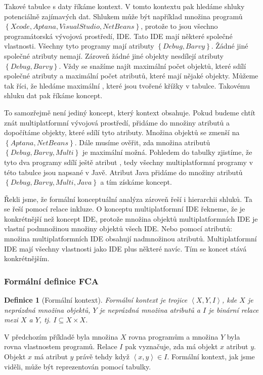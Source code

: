 \documentclass[12pt]{article}
\newcommand{\sssection}[1]{\subsubsection{#1}}
\newcommand{\adds}[1]{\left\{#1\right\}}
\newcommand{\addsp}[1]{\left<#1\right>}
\newtheorem{mydef}{Definice}
\begin{document}
Takové tabulce s daty říkáme kontext. V tomto kontextu pak hledáme shluky potenciálně zajímavých dat. Shlukem může být například množina programů $\adds{Xcode, Aptana, VisualStudio, NetBeans}$, protože to jsou všechno programátorská vývojová prostředí, IDE. Tato IDE mají některé společné vlastnosti. Všechny tyto programy mají atributy $\adds{Debug, Barvy}$. Žádné jiné společné atributy nemají. Zároveň žádné jiné objekty nesdílejí atributy $\adds{Debug, Barvy}$. Vždy se snažíme najít maximální počet objektů, které sdílí společné atributy a maximální počet atributů, které mají nějaké objekty. Můžeme tak říci, že hledáme maximální , které jsou tvořené křížky v tabulce. Takovému shluku dat pak říkáme koncept. 

To samozřejmě není jediný koncept, který kontext obsahuje. Pokud budeme chtít znát multiplatformní vývojová prostředí, přidáme do množiny atributů  a dopočítáme objekty, které sdílí tyto atributy. Množina objektů se zmenší na $\adds{Aptana, NetBeans}$. Dále musíme ověřit, zda množina atributů $\adds{Debug, Barvy, Multi}$ je maximální možná. Pohledem do tabulky zjistíme, že tyto dva programy sdílí ještě atribut , tedy všechny multiplatformní programy v této tabulce jsou napsané v Javě. Atribut Java přidáme do množiny atributů $\adds{Debug, Barvy, Multi, Java}$ a tím získáme koncept.

Řekli jsme, že formální konceptuální analýza zároveň řeší i hierarchii shluků. Ta se řeší pomocí relace inkluze. O konceptu multiplatformní IDE řekneme, že je konkrétnější než koncept IDE, protože množina objektů multiplatformních IDE je vlastní podmnožinou množiny objektů všech IDE. Nebo pomocí atributů: množina multiplatformních IDE obsahují nadmnožinou atributů. Multiplatformní IDE mají všechny vlastnosti jako IDE plus některé navíc. Tím se koncet stává konkrétnějším. 

\sssection{Formální definice FCA}

\begin{mydef}[Formální kontext]
Formální kontext je trojice $\addsp{X, Y, I}$, kde $X$ je neprázdná množina objektů, $Y$ je neprázdná množina atributů a $I$ je binární relace mezi $X$ a $Y$, tj. $I\subseteq X\times X$.
\end{mydef}

V předchozím příkladě byla množina $X$ rovna programům a množina $Y$ byla rovna vlastnostem programů. Relace $I$ pak vyznačuje, zda má objekt $x$ atribut $y$. Objekt $x$ má atribut $y$ právě tehdy když $\addsp{x, y}\in I$. Formální kontext, jak jsme viděli, může být reprezentován pomocí tabulky. 
\end{document}
